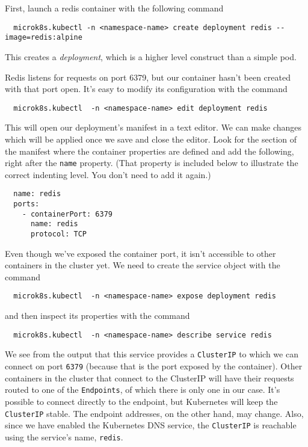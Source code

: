 \documentclass{article}
\begin{document}
First, launch a redis container with the following command

\begin{verbatim}
  microk8s.kubectl -n <namespace-name> create deployment redis --image=redis:alpine
\end{verbatim}

This creates a \emph{deployment}, which is a higher level construct than a simple pod. 

Redis listens for requests on port 6379, but our container hasn't been created with that port open. It's easy to modify its configuration with the command
  
\begin{verbatim}
  microk8s.kubectl  -n <namespace-name> edit deployment redis
\end{verbatim}

This will open our deployment's manifest in a text editor. We can make changes which will be applied once we save and close the editor. Look for the section of the manifest where the container properties are defined and add the following, right after the \texttt{name} property. (That property is included below to illustrate the correct indenting level. You don't need to add it again.)

\begin{verbatim}
  name: redis
  ports:
    - containerPort: 6379
      name: redis
      protocol: TCP
\end{verbatim}

Even though we've exposed the container port, it isn't accessible to other containers in the cluster yet. We need to create the service object with the command

\begin{verbatim}
  microk8s.kubectl  -n <namespace-name> expose deployment redis
\end{verbatim}

and then inspect its properties with the command 

\begin{verbatim}
  microk8s.kubectl  -n <namespace-name> describe service redis
\end{verbatim}

We see from the output that this service provides a \texttt{ClusterIP} to which we can connect on port \texttt{6379} (because that is the port exposed by the container). Other containers in the cluster that connect to the ClusterIP will have their requests routed to one of the \texttt{Endpoints}, of which there is only one in our case. It's possible to connect directly to the endpoint, but Kubernetes will keep the \texttt{ClusterIP} stable. The endpoint addresses, on the other hand, may change. Also, since we have enabled the Kubernetes DNS service, the \texttt{ClusterIP} is reachable using the service's name, \texttt{redis}.
\end{document}
